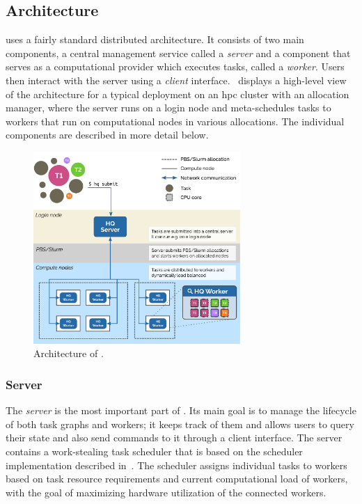 \subsection{Architecture}
\label{hq:architecture}
\hyperqueue{} uses a fairly standard distributed architecture. It consists of two main
components, a central management service called a \emph{server} and a component that
serves as a computational provider which executes tasks, called a \emph{worker}. Users
then interact with the server using a \emph{client} interface.~
displays a high-level view of the \hq{} architecture for a typical deployment on
an \gls{hpc} cluster with an allocation manager, where the server runs on a login
node and meta-schedules tasks to workers that run on computational nodes in various allocations.
The individual components are described in more detail below.

\begin{figure}[h]
	\centering
	\includegraphics[width=0.7\textwidth]{imgs/hq/architecture}
	\caption{Architecture of \hyperqueue{}.}
	\label{fig:hq-architecture}
\end{figure}

\subsubsection*{Server}
The \emph{server} is the most important part of \hyperqueue{}. Its main goal is
to manage the lifecycle of both task graphs and workers; it keeps track of them and allows users to
query their state and also send commands to it through a client interface. The server contains a
work-stealing task scheduler that is based on the \rsds{} scheduler implementation
described in~. The scheduler assigns individual tasks to workers based on
task resource requirements and current computational load of workers, with the goal of maximizing
hardware utilization of the connected workers.


